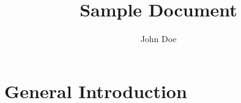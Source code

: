 \documentclass[11pt]{article}
\author{John Doe} \title{Sample Document}
\begin{document}
\maketitle

\chapter{General Introduction}




\end{document}

